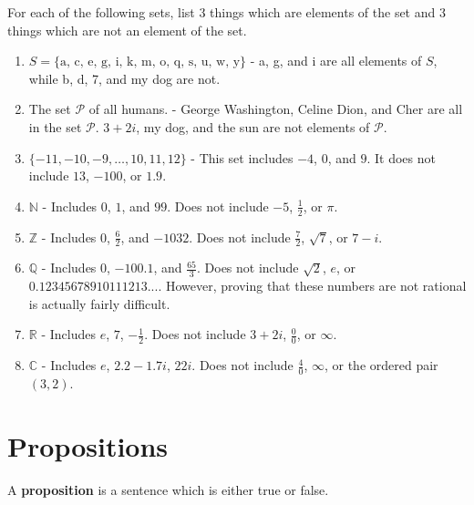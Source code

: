 \begin{solutions}
	For each of the following sets, list $3$ things which are elements of the set and $3$ things which are not an element of the set.
	
	\begin{enumerate}
		\item $S = \{\textrm{a, c, e, g, i, k, m, o, q, s, u, w, y}\}$ - a, g, and i are all elements of $S$, while b, d, 7, and my dog are not.   
		\item The set $\mathcal{P}$ of all humans. -  George Washington, Celine Dion, and Cher are all in the set $\mathcal{P}$.  $3+2i$, my dog, and the sun are not elements of $\mathcal{P}$.
		\item  $\{-11,-10, -9,  \dots, 10, 11, 12\}$ - This set includes $-4$, $0$, and $9$.  It does not include $13$, $-100$, or $1.9$.
		\item $\mathbb{N}$ - Includes $0$, $1$, and $99$.  Does not include $-5$, $\frac{1}{2}$, or $\pi$.
		\item $\mathbb{Z}$ - Includes $0$, $\frac{6}{2}$, and $-1032$.  Does not include $\frac{7}{2}$, $\sqrt{7}$, or $7-i$.
		\item $\mathbb{Q}$ - Includes $0$, $-100.1$, and $\frac{65}{3}$.  Does not include $\sqrt{2}$, $e$, or $0.12345678910111213...$.  However, proving that these numbers are not rational is actually fairly difficult.
		\item $\mathbb{R}$ - Includes $e$, $7$, $-\frac{1}{2}$.  Does not include $3+2i$, $\frac{0}{0}$, or $\infty$.
		\item $\mathbb{C}$ - Includes $e$, $2.2 - 1.7i$, $22i$.  Does not include $\frac{4}{0}$, $\infty$, or the ordered pair $(3,2)$.
	\end{enumerate}
\end{solutions}




\section{Propositions}

\begin{definition}
		A \textbf{proposition} is a sentence which is either true or false.
\end{definition}


